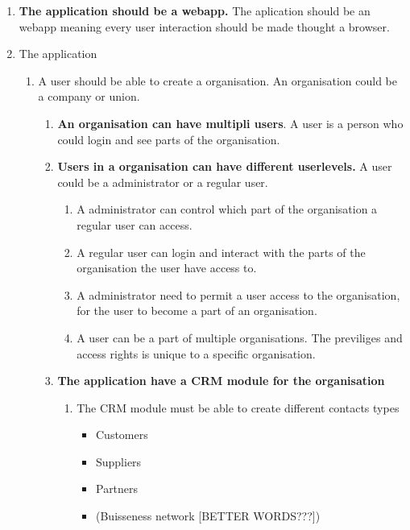 \begin{enumerate}
    \item \textbf{The application should be a webapp.} The aplication should be an webapp meaning every user interaction should be made thought a browser.
    \item The application
    \begin{enumerate}
        \item {A user should be able to create a organisation.} An organisation could be a company or union.
        \begin{enumerate}
            \item \textbf{An organisation can have multipli users}. A user is a person who could login and see parts of the organisation.
            \item \textbf{Users in a organisation can have different userlevels.} A user could be a administrator or a regular user.
            \begin{enumerate}
                \item A administrator can control which part of the organisation a regular user can access.
                \item A regular user can login and interact with the parts of the organisation the user have access to.
                \item A administrator need to permit a user access to the organisation, for the user to become a part of an organisation.
                \item A user can be a part of multiple organisations. The previliges and access rights is unique to a specific organisation.
            \end{enumerate}
            \item \textbf{The application have a CRM module for the organisation}
            \begin{enumerate}
                \item The CRM module must be able to create different contacts types
                \begin{itemize}
                    \item Customers
                    \item Suppliers
                    \item Partners
                    \item (Buisseness network [BETTER WORDS???])
                \end{itemize}
            \end{enumerate}

\end{enumerate}
\end{enumerate}
\end{enumerate}
